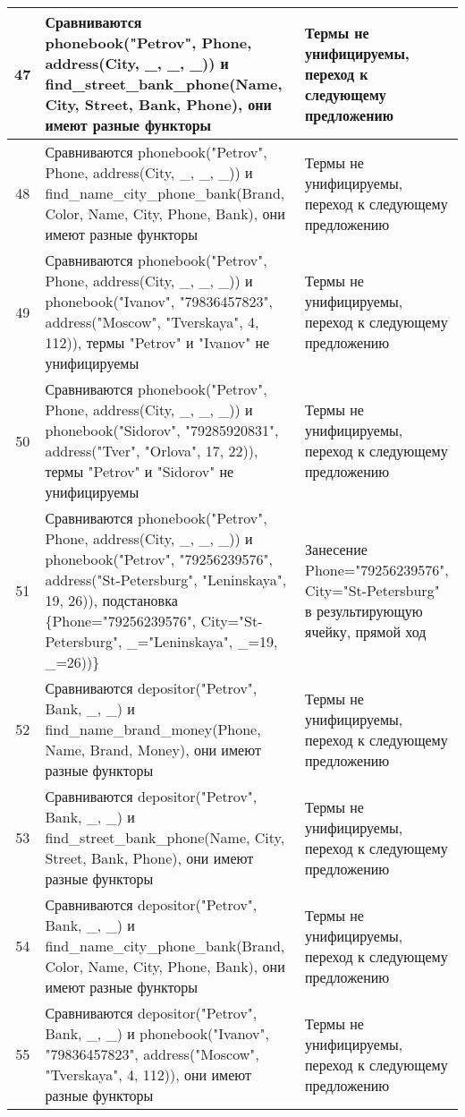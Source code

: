 \documentclass[a4paper,12pt]{article}
\begin{document}
\newpage
\begin{table}[ht!] 
	\begin{tabularx}{\linewidth}{|c|>{\centering}X|>{\centering}X|}
		\hline
		47 & Сравниваются phonebook("Petrov"{}, Phone, address(City, \_, \_, \_)) и find\_street\_bank\_phone(Name, City, Street, Bank, Phone), они имеют разные функторы & Термы не унифицируемы, переход к следующему предложению \tabularnewline
		\hline
		48 & Сравниваются phonebook("Petrov"{}, Phone, address(City, \_, \_, \_)) и find\_name\_city\_phone\_bank(Brand, Color, Name, City, Phone, Bank), они имеют разные функторы & Термы не унифицируемы, переход к следующему предложению \tabularnewline
		\hline
		49 & Сравниваются phonebook("Petrov"{}, Phone, address(City, \_, \_, \_)) и phonebook("Ivanov"{}, "79836457823"{}, address("Moscow"{}, "Tverskaya"{}, 4, 112)), термы "Petrov"{} и "Ivanov"{} не унифицируемы & Термы не унифицируемы, переход к следующему предложению \tabularnewline
		\hline
		50 & Сравниваются phonebook("Petrov"{}, Phone, address(City, \_, \_, \_)) и phonebook("Sidorov"{}, "79285920831"{}, address("Tver"{}, "Orlova"{}, 17, 22)), термы "Petrov"{} и "Sidorov"{} не унифицируемы & Термы не унифицируемы, переход к следующему предложению \tabularnewline
		\hline
		51 & Сравниваются phonebook("Petrov"{}, Phone, address(City, \_, \_, \_)) и phonebook("Petrov"{}, "79256239576"{}, address("St-Petersburg"{}, "Leninskaya"{}, 19, 26)), подстановка \{Phone="79256239576"{}, City="St-Petersburg"{}, \_="Leninskaya"{}, \_=19, \_=26))\} & Занесение Phone="79256239576"{}, City="St-Petersburg"{} в результирующую ячейку, прямой ход \tabularnewline
		\hline
		52 & Сравниваются depositor("Petrov"{}, Bank, \_, \_) и find\_name\_brand\_money(Phone, Name, Brand, Money), они имеют разные функторы & Термы не унифицируемы, переход к следующему предложению \tabularnewline
		\hline
		53 & Сравниваются depositor("Petrov"{}, Bank, \_, \_) и find\_street\_bank\_phone(Name, City, Street, Bank, Phone), они имеют разные функторы & Термы не унифицируемы, переход к следующему предложению \tabularnewline
		\hline
		54 & Сравниваются depositor("Petrov"{}, Bank, \_, \_) и find\_name\_city\_phone\_bank(Brand, Color, Name, City, Phone, Bank), они имеют разные функторы & Термы не унифицируемы, переход к следующему предложению \tabularnewline
		\hline
		55 & Сравниваются depositor("Petrov"{}, Bank, \_, \_) и phonebook("Ivanov"{}, "79836457823"{}, address("Moscow"{}, "Tverskaya"{}, 4, 112)), они имеют разные функторы & Термы не унифицируемы, переход к следующему предложению \tabularnewline
		\hline
	\end{tabularx}
\end{table}
\end{document}
